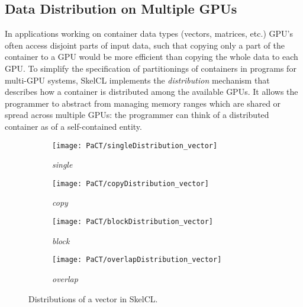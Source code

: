 \subsection{Data Distribution on Multiple GPUs}
In applications working on container data types (vectors, matrices, etc.) GPU's often access disjoint parts of input data, such that copying only a part of the container to a GPU would be more efficient than copying the whole data to each GPU. To simplify the specification of partitionings of containers in programs for multi-GPU systems, SkelCL implements the \emph{distribution} mechanism that describes how a container is distributed among the available GPUs.
It allows the programmer to abstract from managing memory ranges which are shared or spread across multiple GPUs:
the programmer can think of a distributed container as of a self-contained entity.

\begin{figure}[tb]
  \centering
  \begin{subfigure}{.22\textwidth}
    \texttt{[image: PaCT/singleDistribution\_vector]}
    \caption{\emph{single}}
    \label{fig:distributions:single}
  \end{subfigure}
  \hfill
  \begin{subfigure}{.22\textwidth}
    \texttt{[image: PaCT/copyDistribution\_vector]}
    \caption{\emph{copy}}
    \label{fig:distributions:copy}
  \end{subfigure}
  \hfill
  \begin{subfigure}{.22\textwidth}
    \texttt{[image: PaCT/blockDistribution\_vector]}
    \caption{\emph{block}}
    \label{fig:distributions:block}
  \end{subfigure}
  \hfill
  \begin{subfigure}{.22\textwidth}
    \texttt{[image: PaCT/overlapDistribution\_vector]}
    \caption{\emph{overlap}}
    \label{fig:distributions:overlap}
  \end{subfigure}
  \caption{Distributions of a vector in SkelCL.}
  \label{fig:distributions}
  \bigskip
\end{figure}


